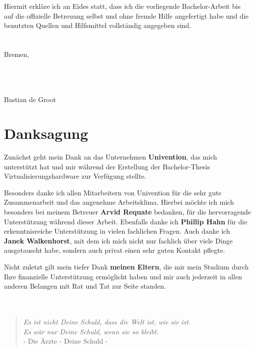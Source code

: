 \documentclass[parskip*,DIV12,BCOR10mm,headsepline,a4paper,12pt]{scrreprt}
\begin{document}
Hiermit erkläre ich an Eides statt, dass ich die vorliegende Bachelor-Arbeit bis auf die offizielle Betreuung selbst und ohne fremde Hilfe angefertigt habe und die benutzten Quellen und Hilfsmittel vollständig angegeben sind.
\\\\\\
Bremen, \date{\today}
\\\\\\
Bastian de Groot
\newpage
\chapter*{Danksagung}
Zunächst geht mein Dank an das Unternehmen \textbf{Univention}, das mich unterstützt hat und mir während der Erstellung der Bachelor-Thesis Virtualisierungshardware zur Verfügung stellte.

Besonders danke ich allen Mitarbeitern von Univention für die sehr gute Zusammenarbeit und das angenehme Arbeitsklima. Hierbei möchte ich mich besonders bei meinem Betreuer \textbf{Arvid Requate} bedanken, für die hervorragende Unterstützung während dieser Arbeit. Ebenfalls danke ich \textbf{Phillip Hahn} für die erkenntnisreiche Unterstützung in vielen fachlichen Fragen. Auch danke ich \textbf{Janek Walkenhorst}, mit dem ich mich nicht nur fachlich über viele Dinge ausgetauscht habe, sondern auch privat einen sehr guten Kontakt pflegte.

Nicht zuletzt gilt mein tiefer Dank \textbf{meinen Eltern}, die mir mein Studium durch Ihre finanzielle Unterstützung ermöglicht haben und mir auch jederzeit in allen anderen Belangen mit Rat und Tat zur Seite standen.
\\\\\\
\begin{quote}\centering
\textit{Es ist nicht Deine Schuld, dass die Welt ist, wie sie ist.\\
Es wär nur Deine Schuld, wenn sie so bleibt.}\\
\fontsize{9pt}{10pt}\selectfont - Die Ärzte - Deine Schuld -
\end{quote}

\newpage
\tableofcontents






\appendix

\newpage





\listoffigures
\lstlistoflistings
\end{document}
